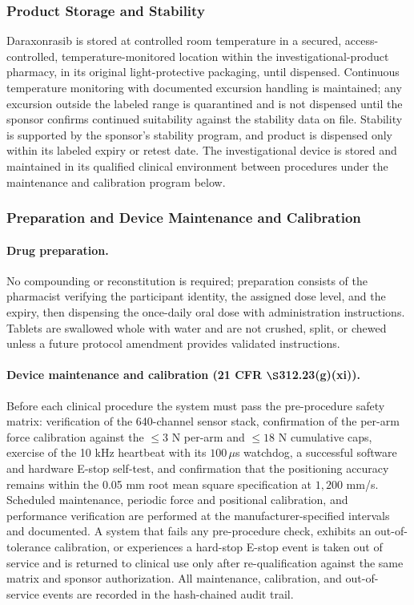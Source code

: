 \subsubsection{Product Storage and Stability}

Daraxonrasib is stored at controlled room temperature in a secured,
access-controlled, temperature-monitored location within the investigational-product
pharmacy, in its original light-protective packaging, until dispensed. Continuous
temperature monitoring with documented excursion handling is maintained; any
excursion outside the labeled range is quarantined and is not dispensed until the
sponsor confirms continued suitability against the stability data on file. Stability
is supported by the sponsor's stability program, and product is dispensed only
within its labeled expiry or retest date. The investigational device is stored and
maintained in its qualified clinical environment between procedures under the
maintenance and calibration program below.

\subsubsection{Preparation and Device Maintenance and Calibration}

\paragraph{Drug preparation.}
No compounding or reconstitution is required; preparation consists of the
pharmacist verifying the participant identity, the assigned dose level, and the
expiry, then dispensing the once-daily oral dose with administration instructions.
Tablets are swallowed whole with water and are not crushed, split, or chewed unless
a future protocol amendment provides validated instructions.

\paragraph{Device maintenance and calibration (21 CFR $\S$312.23(g)(xi)).}
Before each clinical procedure the system must pass the pre-procedure safety matrix:
verification of the 640-channel sensor stack, confirmation of the per-arm force
calibration against the $\leq 3$ N per-arm and $\leq 18$ N cumulative caps,
exercise of the 10 kHz heartbeat with its $100\,\mu$s watchdog, a successful
software and hardware E-stop self-test, and confirmation that the positioning
accuracy remains within the 0.05 mm root mean square specification at $1{,}200$
mm/s. Scheduled maintenance, periodic force and positional calibration, and
performance verification are performed at the manufacturer-specified intervals and
documented. A system that fails any pre-procedure check, exhibits an out-of-tolerance
calibration, or experiences a hard-stop E-stop event is taken out of service and is
returned to clinical use only after re-qualification against the same matrix and
sponsor authorization. All maintenance, calibration, and out-of-service events are
recorded in the hash-chained audit trail.

